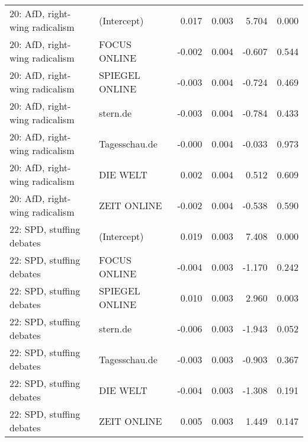 \begin{adjustbox}{width=\textwidth,totalheight=\textheight,keepaspectratio}
\begin{tabular}{llrrrr}
  20: AfD, right-wing radicalism & (Intercept) & 0.017 & 0.003 & 5.704 & 0.000 \\ 
  20: AfD, right-wing radicalism & FOCUS ONLINE & -0.002 & 0.004 & -0.607 & 0.544 \\ 
  20: AfD, right-wing radicalism & SPIEGEL ONLINE & -0.003 & 0.004 & -0.724 & 0.469 \\ 
  20: AfD, right-wing radicalism & stern.de & -0.003 & 0.004 & -0.784 & 0.433 \\ 
  20: AfD, right-wing radicalism & Tagesschau.de & -0.000 & 0.004 & -0.033 & 0.973 \\ 
  20: AfD, right-wing radicalism & DIE WELT & 0.002 & 0.004 & 0.512 & 0.609 \\ 
  20: AfD, right-wing radicalism & ZEIT ONLINE & -0.002 & 0.004 & -0.538 & 0.590 \\ 
  22: SPD, stuffing debates & (Intercept) & 0.019 & 0.003 & 7.408 & 0.000 \\ 
  22: SPD, stuffing debates & FOCUS ONLINE & -0.004 & 0.003 & -1.170 & 0.242 \\ 
  22: SPD, stuffing debates & SPIEGEL ONLINE & 0.010 & 0.003 & 2.960 & 0.003 \\ 
  22: SPD, stuffing debates & stern.de & -0.006 & 0.003 & -1.943 & 0.052 \\ 
  22: SPD, stuffing debates & Tagesschau.de & -0.003 & 0.003 & -0.903 & 0.367 \\ 
  22: SPD, stuffing debates & DIE WELT & -0.004 & 0.003 & -1.308 & 0.191 \\ 
  22: SPD, stuffing debates & ZEIT ONLINE & 0.005 & 0.003 & 1.449 & 0.147 \\ 
   \hline
\end{tabular}
\end{adjustbox}
